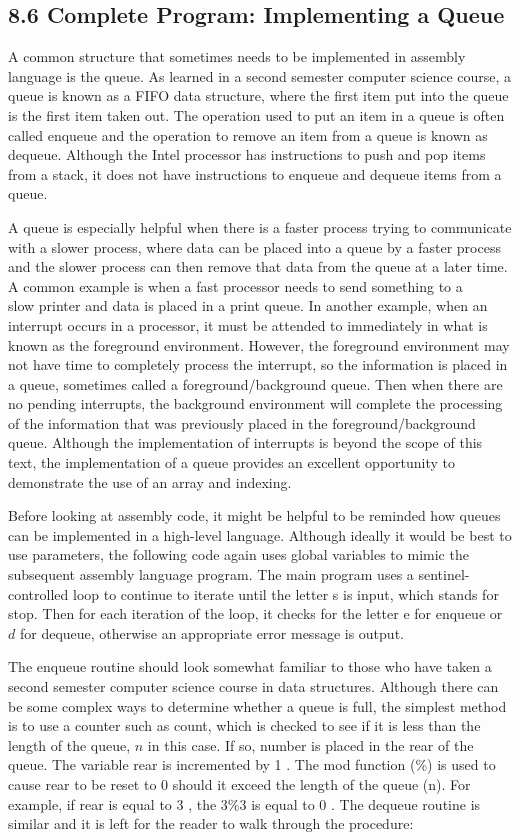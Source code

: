 \documentclass[10pt]{book}
\begin{document}
\subsection*{8.6 Complete Program: Implementing a Queue}
A common structure that sometimes needs to be implemented in assembly language is the queue. As learned in a second semester computer science course, a queue is known as a FIFO data structure, where the first item put into the queue is the first item taken out. The operation used to put an item in a queue is often called enqueue and the operation to remove an item from a queue is known as dequeue. Although the Intel processor has instructions to push and pop items from a stack, it does not have instructions to enqueue and dequeue items from a queue.

A queue is especially helpful when there is a faster process trying to communicate with a slower process, where data can be placed into a queue by a faster process and the slower process can then remove that data from the queue at a later time. A common example is when a fast processor needs to send something to a\\
slow printer and data is placed in a print queue. In another example, when an interrupt occurs in a processor, it must be attended to immediately in what is known as the foreground environment. However, the foreground environment may not have time to completely process the interrupt, so the information is placed in a queue, sometimes called a foreground/background queue. Then when there are no pending interrupts, the background environment will complete the processing of the information that was previously placed in the foreground/background queue. Although the implementation of interrupts is beyond the scope of this text, the implementation of a queue provides an excellent opportunity to demonstrate the use of an array and indexing.


Before looking at assembly code, it might be helpful to be reminded how queues can be implemented in a high-level language. Although ideally it would be best to use parameters, the following code again uses global variables to mimic the subsequent assembly language program. The main program uses a sentinel-controlled loop to continue to iterate until the letter s is input, which stands for stop. Then for each iteration of the loop, it checks for the letter e for enqueue or $d$ for dequeue, otherwise an appropriate error message is output.

The enqueue routine should look somewhat familiar to those who have taken a second semester computer science course in data structures. Although there can be some complex ways to determine whether a queue is full, the simplest method is to use a counter such as count, which is checked to see if it is less than the length of the queue, $n$ in this case. If so, number is placed in the rear of the queue. The variable rear is incremented by 1 . The mod function (\%) is used to cause rear to be reset to 0 should it exceed the length of the queue (n). For example, if rear is equal to 3 , the $3 \% 3$ is equal to 0 . The dequeue routine is similar and it is left for the reader to walk through the procedure:
\end{document}
